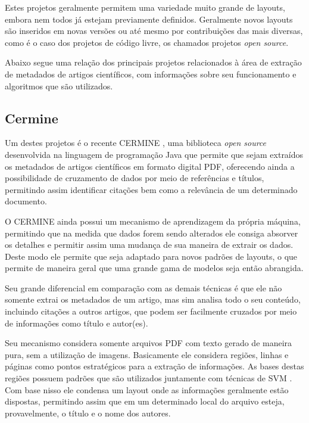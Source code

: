 Estes projetos geralmente permitem uma variedade muito grande de layouts, embora nem todos já estejam previamente definidos. Geralmente novos layouts são inseridos em novas versões ou até mesmo por contribuições das mais diversas, como é o caso dos projetos de código livre, os chamados projetos \textit{open source}.

Abaixo segue uma relação dos principais projetos relacionados à área de extração de metadados de artigos científicos, com informações sobre seu funcionamento e algoritmos que são utilizados.

\subsection{Cermine}
\label{ssec:cermine}


Um destes projetos é o recente CERMINE \cite{cermine}, uma biblioteca \textit{open source} desenvolvida na linguagem de programação Java que permite que sejam extraídos os metadados de artigos científicos em formato digital PDF, oferecendo ainda a possibilidade de cruzamento de dados por meio de referências e títulos, permitindo assim identificar citações bem como a relevância de um determinado documento.

O CERMINE ainda possui um mecanismo de aprendizagem da própria máquina, permitindo que na medida que dados forem sendo alterados ele consiga absorver os detalhes e permitir assim uma mudança de sua maneira de extrair os dados. Deste modo ele permite que seja adaptado para novos padrões de layouts, o que permite de maneira geral que uma grande gama de modelos seja então abrangida. 

Seu grande diferencial em comparação com as demais técnicas é que ele não somente extrai os metadados de um artigo, mas sim analisa todo o seu conteúdo, incluindo citações a outros artigos, que podem ser facilmente cruzados por meio de informações como título e autor(es).

Seu mecanismo considera somente arquivos PDF com texto gerado de maneira pura, sem a utilização de imagens. Basicamente ele considera regiões, linhas e páginas como pontos estratégicos para a extração de informações. As bases destas regiões possuem padrões que são utilizados juntamente com técnicas de SVM \cite{Han-SVM}. Com base nisso ele condensa um layout onde as informações geralmente estão dispostas, permitindo assim que em um determinado local do arquivo esteja, provavelmente, o título e o nome dos autores. 

